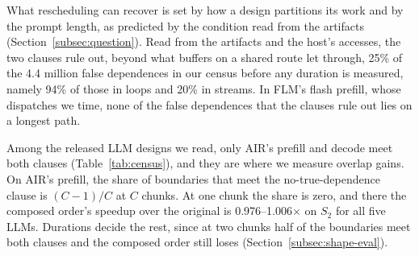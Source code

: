 What rescheduling can recover is set by how a design partitions its work and by the prompt length, as predicted by the condition read from the artifacts (Section~\ref{subsec:question}).
\label{subsec:observed}
Read from the artifacts and the host's accesses, the two clauses rule out, beyond what buffers on a shared route let through, 25\% of the 4.4 million false dependences in our census before any duration is measured, namely 94\% of those in loops and 20\% in streams.
In FLM's flash prefill, whose dispatches we time, none of the false dependences that the clauses rule out lies on a longest path.

Among the released LLM designs we read, only AIR's prefill and decode meet both clauses (Table~\ref{tab:census}), and they are where we measure overlap gains.
On AIR's prefill, the share of boundaries that meet the no-true-dependence clause is $(C-1)/C$ at $C$ chunks.
At one chunk the share is zero, and there the composed order's speedup over the original is 0.976--1.006$\times$ on $S_2$ for all five LLMs.
Durations decide the rest, since at two chunks half of the boundaries meet both clauses and the composed order still loses (Section~\ref{subsec:shape-eval}).

